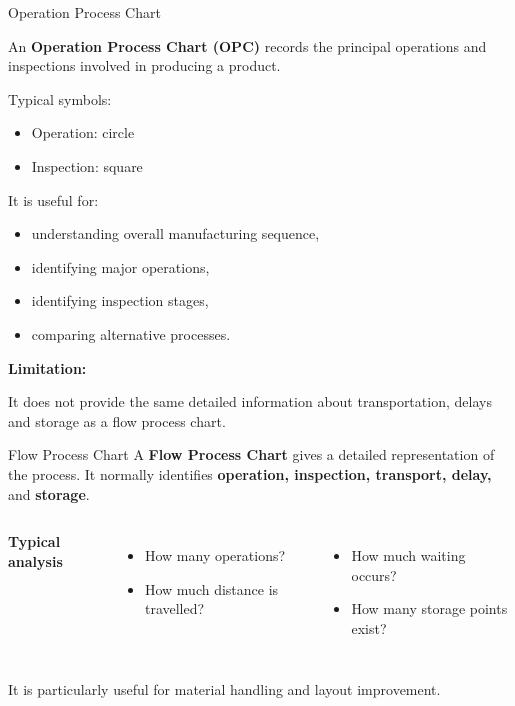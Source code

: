 \documentclass[aspectratio=169,10pt]{beamer}
\begin{document}
\begin{frame}[shrink=18]{Operation Process Chart}
\small

An \textbf{Operation Process Chart (OPC)} records the principal
operations and inspections involved in producing a product.

\vspace{5pt}

Typical symbols:

\begin{itemize}
    \item Operation: circle
    \item Inspection: square
\end{itemize}

It is useful for:

\begin{itemize}
    \item understanding overall manufacturing sequence,
    \item identifying major operations,
    \item identifying inspection stages,
    \item comparing alternative processes.
\end{itemize}

\vspace{5pt}

\textbf{Limitation:}

It does not provide the same detailed information about transportation,
delays and storage as a flow process chart.

\end{frame}


\begin{frame}{Flow Process Chart}
\small
A \textbf{Flow Process Chart} gives a detailed representation of the process.
It normally identifies \textbf{operation, inspection, transport, delay,} and \textbf{storage}.
\vspace{2pt}
\begin{columns}[T,onlytextwidth]
\textbf{Typical analysis}
\begin{itemize}
\item How many operations?
\item How much distance is travelled?
\end{itemize}
\begin{itemize}
\item How much waiting occurs?
\item How many storage points exist?
\end{itemize}
\end{columns}
\vspace{3pt}
It is particularly useful for material handling and layout improvement.
\end{frame}
\end{document}
